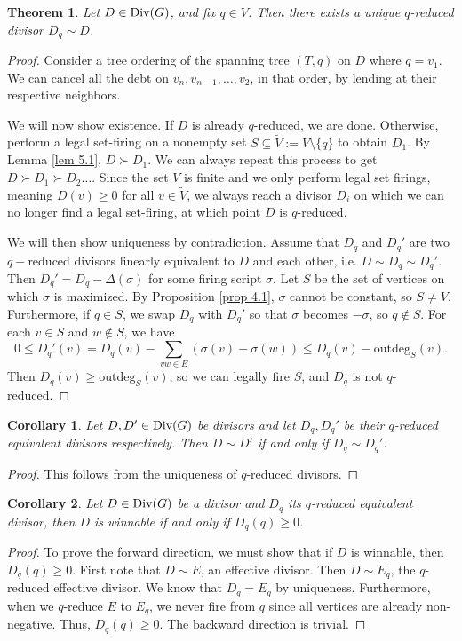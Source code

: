 \documentclass[openany, amssymb, psamsfonts]{amsart}
\newtheorem{thm}{Theorem}[section]
\newtheorem{cor}{Corollary}[section]
\theoremstyle{definition}
\numberwithin{equation}{section}
\begin{document}
\begin{thm}
\label{thm 5.1}
Let $D\in \textup{Div}(G)$, and fix $q\in V$. Then there exists a unique $q$-reduced  divisor $D_q \sim D$.
\end{thm}
\begin{proof}
Consider a tree ordering of the spanning tree $(T, q)$ on $D$ where $q=v_1$. We can cancel all the debt on $v_n, v_{n-1},\dots,v_2$, in that order, by lending at their respective neighbors.

We will now show existence. If $D$ is already $q$-reduced, we are done. Otherwise, perform a legal set-firing on a nonempty set $S\subseteq \tilde{V}:=V\setminus \{q\}$ to obtain $D_1$. By Lemma \ref{lem 5.1}, $D\succ D_1$. We can always repeat this process to get $D \succ D_1 \succ D_2 \dots$. Since the set $\tilde{V}$ is finite and we only perform legal set firings, meaning $D(v)\geq 0$ for all $v\in \tilde{V}$, we always reach a divisor $D_i$ on which we can no longer find a legal set-firing, at which point $D$ is $q$-reduced.

We will then show uniqueness by contradiction. Assume that $D_q$ and $D_q'$ are two $q-$reduced divisors linearly equivalent to $D$ and each other, i.e. $D\sim D_q\sim D_q'$. Then $D_q'=D_q-\Delta(\sigma)$ for some firing script $\sigma$. Let $S$ be the set of vertices on which $\sigma$ is maximized. By Proposition \ref{prop 4.1}, $\sigma$ cannot be constant, so $S\neq V$. Furthermore, if $q\in S$, we swap $D_q$ with $D_q'$ so that $\sigma$ becomes $-\sigma$, so $q\notin S$. For each $v\in S$ and $w\notin S$, we have
\[0\leq D_q'(v)=D_q(v)-\sum_{vw\in E}(\sigma(v)-\sigma(w))\leq D_q(v)-\text{outdeg}_S(v).\]
Then $D_q(v)\geq \text{outdeg}_S(v)$, so we can legally fire $S$, and $D_q$ is not $q$-reduced.
\end{proof}

\begin{cor}
\label{cor 5.1}
Let $D, D' \in \textup{Div}(G)$ be divisors and let $D_q, D_q'$ be their $q$-reduced  equivalent divisors respectively. Then $D\sim D'$ if and only if $D_q\sim D_q'$.
\end{cor}
\begin{proof}
This follows from the uniqueness of $q$-reduced divisors.
\end{proof}

\begin{cor}
\label{cor 5.2}
Let $D \in \textup{Div}(G)$ be a divisor and $D_q$ its $q$-reduced equivalent
divisor, then $D$ is winnable if and only if $D_q(q)\geq 0$.
\end{cor}
\begin{proof}
To prove the forward direction, we must show that if $D$ is winnable, then $D_q(q)\geq 0$. First note that $D\sim E$, an effective divisor. Then $D\sim E_q$, the $q$-reduced effective divisor. We know that $D_q=E_q$ by uniqueness. Furthermore, when we $q$-reduce $E$ to $E_q$, we never fire from $q$ since all vertices are already non-negative. Thus, $D_q(q)\geq 0$. The backward direction is trivial.
\end{proof}
\end{document}
